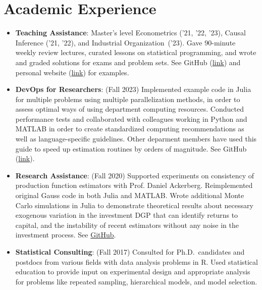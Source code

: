 \documentclass[a4paper,20pt]{article}
\newcommand{\resumeItem}[2]{
  \item\small{
    \textbf{#1}{: #2 \vspace{-2pt}}
  }
}
\newcommand{\resumeSubItem}[2]{\resumeItem{#1}{#2}\vspace{-3pt}}
\newcommand{\resumeSubHeadingListEnd}{\end{itemize}}
\begin{document}
\begin{itemize}[leftmargin=*, itemindent=-9em]
\resumeSubHeadingListEnd

\vspace{-5pt}\section{Academic Experience}
\begin{itemize}[leftmargin=*, itemindent=-12pt]
  \resumeSubItem{Teaching Assistance}{Master's level Econometrics ('21, '22, '23), Causal Inference ('21, '22), and Industrial Organization~('23). Gave 90-minute weekly review lectures, curated lessons on statistical programming, and wrote and graded solutions for exams and problem sets. See GitHub (\href{https://github.com/nateybear/causal-inference-2022}{link}) and personal website (\href{https://pages.nghattersley.net/metrics-in-r}{link}) for examples.}
\resumeSubItem{DevOps for Researchers}{(Fall 2023) Implemented example code in Julia for multiple problems using multiple parallelization methods, in order to assess optimal ways of using department computing resources. Conducted performance tests and collaborated with colleagues working in Python and MATLAB in order to create standardized computing recommendations as well as language-specific guidelines. Other deparment members have used this guide to speed up estimation routines by orders of magnitude. See GitHub (\href{https://github.com/nateybear/parallel-racers/wiki}{link}).}
\resumeSubItem{Research Assistance}{(Fall 2020) Supported experiments on consistency of production function estimators with Prof. Daniel Ackerberg. Reimplemented original Gauss code in both Julia and MATLAB. Wrote additional Monte Carlo simulations in Julia to demonstrate theoretical results about necessary exogenous variation in the investment DGP that can identify returns to capital, and the instability of recent estimators without any noise in the investment process. See \href{https://github.com/nateybear/production-functions.jl}{GitHub}.}
\vspace{2pt}
\resumeSubItem{Statistical Consulting}{(Fall 2017) Consulted for Ph.D.\ candidates and postdocs from various fields with data analysis problems in R. Used statistical education to provide input on experimental design and appropriate analysis for problems like repeated sampling, hierarchical models, and model selection.}
\resumeSubHeadingListEnd
\vspace{-5pt}
\end{document}
